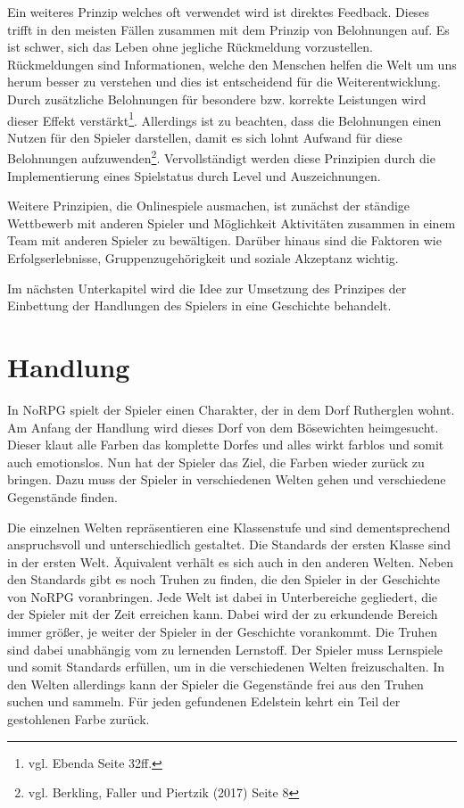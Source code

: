 Ein weiteres Prinzip welches oft verwendet wird ist direktes Feedback. Dieses trifft in den meisten Fällen zusammen mit dem Prinzip von Belohnungen auf. Es ist schwer, sich das Leben ohne jegliche Rückmeldung vorzustellen. Rückmeldungen sind Informationen, welche den Menschen helfen die Welt um uns herum besser zu verstehen und dies ist entscheidend für die Weiterentwicklung. Durch zusätzliche Belohnungen für besondere bzw. korrekte Leistungen wird dieser Effekt verstärkt\footnote{vgl. Ebenda Seite 32ff.}. Allerdings ist zu beachten, dass die Belohnungen einen Nutzen für den Spieler darstellen, damit es sich lohnt Aufwand für diese Belohnungen aufzuwenden\footnote{vgl. Berkling, Faller und Piertzik \cite{gamesPaper} (2017) Seite 8}. Vervollständigt werden diese Prinzipien durch die Implementierung eines Spielstatus durch Level und Auszeichnungen.

Weitere Prinzipien, die Onlinespiele ausmachen, ist zunächst der ständige Wettbewerb mit anderen Spieler und Möglichkeit Aktivitäten zusammen in einem Team mit anderen Spieler zu bewältigen. Darüber hinaus sind die Faktoren wie Erfolgserlebnisse, Gruppenzugehörigkeit und soziale Akzeptanz wichtig. 

Im nächsten Unterkapitel wird die Idee zur Umsetzung des Prinzipes der Einbettung der Handlungen des Spielers in eine Geschichte behandelt.
	
\section{Handlung}\label{geschichte}
In NoRPG spielt der Spieler einen Charakter, der in dem Dorf Rutherglen wohnt. Am Anfang der Handlung wird dieses Dorf von dem Bösewichten heimgesucht. Dieser klaut alle Farben das komplette Dorfes und alles wirkt farblos und somit auch emotionslos. Nun hat der Spieler das Ziel, die Farben wieder zurück zu bringen. Dazu muss der Spieler in verschiedenen Welten gehen und verschiedene Gegenstände finden.

\pagebreak
Die einzelnen Welten repräsentieren eine Klassenstufe und sind dementsprechend anspruchsvoll und unterschiedlich gestaltet. Die Standards der ersten Klasse sind in der ersten Welt. Äquivalent verhält es sich auch in den anderen Welten. Neben den Standards gibt es noch Truhen zu finden, die den Spieler in der Geschichte von NoRPG voranbringen. Jede Welt ist dabei in Unterbereiche gegliedert, die der Spieler mit der Zeit erreichen kann. Dabei wird der zu erkundende Bereich immer größer, je weiter der Spieler in der Geschichte vorankommt. Die Truhen sind dabei unabhängig vom zu lernenden Lernstoff. Der Spieler muss Lernspiele und somit Standards erfüllen, um in die verschiedenen Welten freizuschalten. In den Welten allerdings kann der Spieler die Gegenstände frei aus den Truhen suchen und sammeln. Für jeden gefundenen Edelstein kehrt ein Teil der gestohlenen Farbe zurück.

